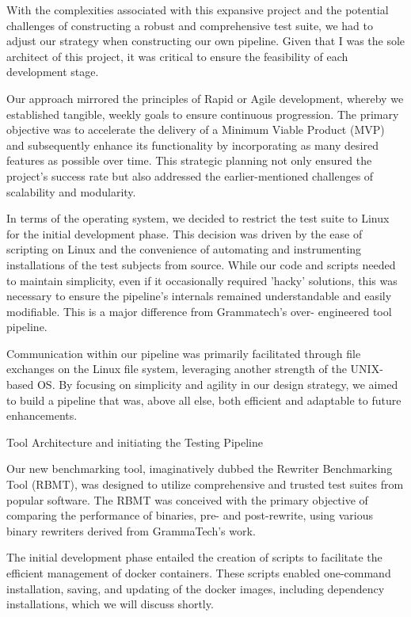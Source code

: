 \documentclass[a4paper,11pt,oneside]{report}
\begin{document}
With the complexities associated with this expansive project and the potential
challenges of constructing a robust and comprehensive test suite, we had to adjust our
strategy when constructing our own pipeline. Given that I was the sole architect of this
project, it was critical to ensure the feasibility of each development stage.

Our approach mirrored the principles of Rapid or Agile development, whereby we
established tangible, weekly goals to ensure continuous progression. The primary objective
was to accelerate the delivery of a Minimum Viable Product (MVP) and subsequently
enhance its functionality by incorporating as many desired features as possible over time.
This strategic planning not only ensured the project's success rate but also addressed the
earlier-mentioned challenges of scalability and modularity.

In terms of the operating system, we decided to restrict the test suite to Linux for
the initial development phase. This decision was driven by the ease of scripting on Linux and
the convenience of automating and instrumenting installations of the test subjects from
source. While our code and scripts needed to maintain simplicity, even if it occasionally
required 'hacky' solutions, this was necessary to ensure the pipeline's internals remained
understandable and easily modifiable. This is a major difference from Grammatech’s over-
engineered tool pipeline.

Communication within our pipeline was primarily facilitated through file exchanges
on the Linux file system, leveraging another strength of the UNIX-based OS. By focusing on
simplicity and agility in our design strategy, we aimed to build a pipeline that was, above all
else, both efficient and adaptable to future enhancements.

Tool Architecture and initiating the Testing Pipeline

Our new benchmarking tool, imaginatively dubbed the Rewriter Benchmarking Tool
(RBMT), was designed to utilize comprehensive and trusted test suites from popular
software. The RBMT was conceived with the primary objective of comparing the
performance of binaries, pre- and post-rewrite, using various binary rewriters derived from
GrammaTech's work.

The initial development phase entailed the creation of scripts to facilitate the
efficient management of docker containers. These scripts enabled one-command
installation, saving, and updating of the docker images, including dependency installations,
which we will discuss shortly.
\end{document}
